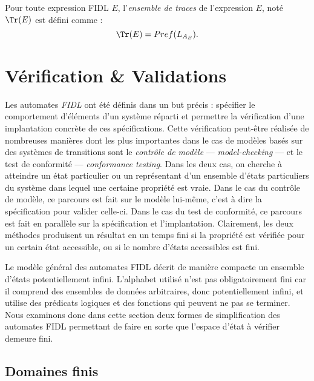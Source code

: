 \begin{definition}
    Pour toute expression \textsf{FIDL} $E$, l'\emph{ensemble de
      traces} de l'expression $E$, not\'e $\Tr(E)$  est
    d\'efini comme :
$$
\Tr(E) = Pref(L_{A_E}).
$$
\end{definition} 

\section{V\'erification \& Validations}
\label{sec:les-contraintes}

Les automates \emph{FIDL} ont \'et\'e d\'efinis dans un but pr\'ecis :
sp\'ecifier le comportement d'\'el\'ements d'un syst\`eme
r\'eparti et permettre la v\'erification d'une implantation
concr\`ete de ces sp\'ecifications. Cette v\'erification
peut-\^etre r\'ealis\'ee de nombreuses mani\`eres dont les plus
importantes dans le cas de mod\`eles bas\'es sur des syst\`emes de
transitions sont le \emph{contr\^ole de mod\`ele} --- \emph{model-checking} --- et
le test de conformit\'e --- \emph{conformance testing}. 
Dans les deux  cas, on cherche \`a atteindre un \'etat particulier
ou un repr\'esentant d'un ensemble d'\'etats particuliers du
syst\`eme dans lequel une certaine propri\'et\'e est vraie. Dans le
cas du contr\^ole de mod\`ele, ce parcours est fait sur le mod\`ele
lui-m\^eme, c'est \`a dire la sp\'ecification pour valider
celle-ci. Dans le cas du test de conformit\'e, ce parcours est fait
en parall\`ele sur la sp\'ecification et
l'implantation. Clairement, les deux m\'ethodes produisent un
r\'esultat en un temps fini si la propri\'et\'e est
v\'erifi\'ee pour un certain \'etat accessible, ou si le nombre
d'\'etats accessibles est fini. 

Le mod\`ele g\'en\'eral des automates \textsf{FIDL} d\'ecrit de
mani\`ere compacte un ensemble d'\'etats potentiellement
infini. L'alphabet utilis\'e n'est pas 
obligatoirement fini car il comprend des ensembles de donn\'ees
arbitraires, donc potentiellement infini, et utilise des pr\'edicats
logiques et  des fonctions qui peuvent ne pas se terminer. Nous
examinons donc dans cette section deux formes de simplification des
automates \textsf{FIDL} permettant de faire en sorte que l'espace
d'\'etat \`a v\'erifier demeure fini.

\subsection{Domaines finis}
\label{sec:regularite}

